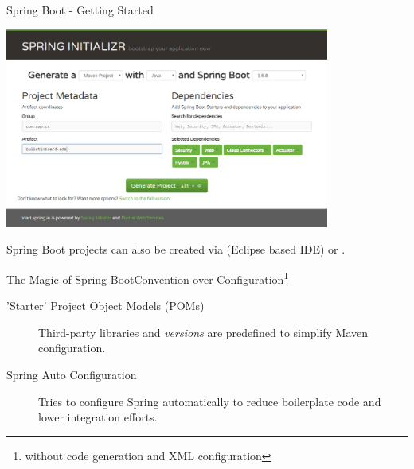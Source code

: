\begin{frame}[c]{Spring Boot - Getting Started}
\centerline{\includegraphics[width=0.8\textwidth]{../SpringBoot/images/Spring_Initializer}}
\centerline{}
\vfill
\scriptsize
Spring Boot projects can also be created via  (Eclipse based IDE) or .
\end{frame}


\begin{frame}{The Magic of Spring Boot}{Convention over Configuration\footnote{without code generation and XML configuration}} 
\begin{description}
	\item['Starter' Project Object Models (POMs)] Third-party libraries and \textit{versions} are predefined to simplify Maven configuration.
\end{description}
\vfill
\begin{description}
	\item[Spring Auto Configuration] Tries to configure Spring automatically to reduce boilerplate code and lower integration efforts.
\end{description}
\end{frame}

